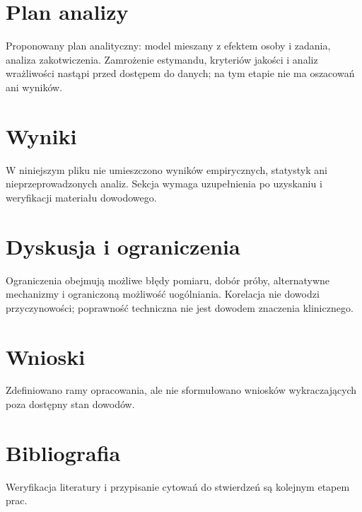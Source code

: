\documentclass[11pt,a4paper]{article}
\begin{document}
\section{Plan analizy}

Proponowany plan analityczny: model mieszany z efektem osoby i zadania, analiza zakotwiczenia. Zamrożenie estymandu, kryteriów jakości i analiz wrażliwości nastąpi przed dostępem do danych; na tym etapie nie ma oszacowań ani wyników.

\section{Wyniki}

W niniejszym pliku nie umieszczono wyników empirycznych, statystyk ani nieprzeprowadzonych analiz. Sekcja wymaga uzupełnienia po uzyskaniu i weryfikacji materiału dowodowego.

\section{Dyskusja i ograniczenia}

Ograniczenia obejmują możliwe błędy pomiaru, dobór próby, alternatywne mechanizmy i ograniczoną możliwość uogólniania. Korelacja nie dowodzi przyczynowości; poprawność techniczna nie jest dowodem znaczenia klinicznego.

\section{Wnioski}

Zdefiniowano ramy opracowania, ale nie sformułowano wniosków wykraczających poza dostępny stan dowodów.

\section*{Bibliografia}

Weryfikacja literatury i przypisanie cytowań do stwierdzeń są kolejnym etapem prac.
\end{document}
